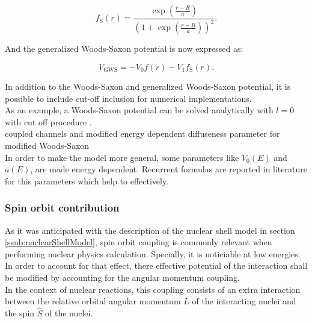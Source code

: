 \documentclass[openany]{book}
\begin{document}
\begin{equation}  \label{eq:potential_WoodsSaxon2_surfaceFermiDirac}
	f_{\mathrm{S}}(r) = \frac{\exp{\left(\frac{r - R}{a}\right)}}{\left(1 + \exp {\left(\frac{r- R}{a}\right)}\right)^2}.
\end{equation}

And the generalized Woods-Saxon potential is now expressed as: 

\begin{equation} \label{eq:potential_GeneralWoodsSaxon}
	V_{\mathrm{GWS}} = -V_0 f(r) - V_1 	f_{\mathrm{S}}(r).
\end{equation}

In addition to the Woods-Saxon and generalized Woods-Saxon potential, it is possible to include cut-off inclusion for numerical implementations. \\

As an example, a Woods-Saxon potential can be solved analytically with $l = 0$ with cut off procedure \cite{salamon_baran_vertse_2016}. \\

coupled channels and modified energy dependent diffuseness parameter for modified Woods-Saxon \cite{singh_sukhvinder_kharab_2013A} \\


In order to make the model more general, some parameters like $V_0(E)$ and $a(E)$, are made energy dependent. Recurrent formulas are reported in literature for this parameters which help to effectively.

\subsubsection{Spin orbit contribution} \label{sub:potential_effective_spinOrbit}

As it was anticipated with the description of the nuclear shell model in section \ref{ssub:nuclearShellModel}, spin orbit coupling is commonly relevant when performing nuclear physics calculation. Specially, it is noticiable at low energies. \\

In order to account for that effect, there effective potential of the interaction shall be modified by accounting for the angular momentum coupling. \\

 In the context of nuclear reactions, this coupling consists of an extra interaction between the relative orbital angular momentum $\hat L$ of the interacting nuclei and the spin $\hat S$ of the nuclei. \\
\end{document}

